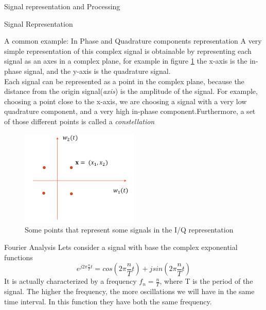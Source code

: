 \begin{section}{Signal representation and Processing}
\begin{subsection}{Signal Representation}
\begin{subsubsection}{A common example: In Phase and Quadrature components representation}
      A very simple representation of this complex signal is obtainable by representing each signal 
      as an axes in a complex plane, for example in figure \ref{fig:Complex Plane} the x-axis 
      is the in-phase signal, and the y-axis is the quadrature signal.\\
      Each signal can be represented as a point in the complex plane, because the distance from the
      origin signal(\textit{axis}) is the amplitude of the signal.
      For example, choosing a point close to the x-axis, we are choosing a signal with a very low
      quadrature component, and a very high in-phase component.Furthermore, a set of those 
      different points is called a \textit{constellation}\\
      \begin{figure}[h]
        \centering
        \includegraphics[width=0.5\textwidth]{img/iq representation.png}
        \caption{Some points that represent some signals in the I/Q representation}
        \label{fig:Complex Plane}
      \end{figure}
    \end{subsubsection}
  \end{subsection}
  \begin{subsection}{Fourier Analysis}
    Lets consider a signal with base the complex exponential functions 
    \begin{equation}
      e^{j2\pi \frac{n}{T} t} = cos(2\pi \frac{n}{T} t) + j sin(2\pi \frac{n}{T} t)
      \label{euler formula}
    \end{equation}
    It is actually characterized by a frequency $f_n = \frac{n}{T}$, where T is the period of the
    signal. The higher the frequency, the more oscillations we will have in the same time interval.
    In this function they have both the same frequency.\\


\end{subsection}
\end{section}
